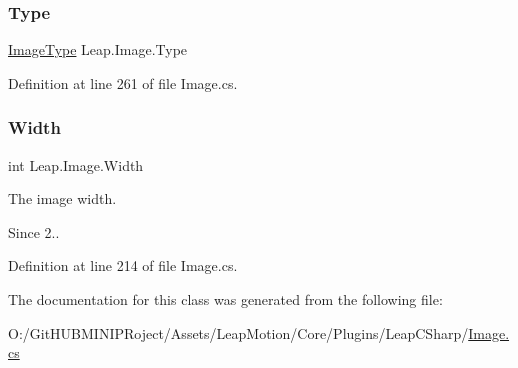 \mbox{\label{class_leap_1_1_image_abaa998d9eec529b2e69a0df4417502ee}} 
\subsubsection{\texorpdfstring{Type}{Type}}
{\footnotesize\ttfamily \mbox{\hyperlink{class_leap_1_1_image_a876a507d46b2dfce38d703a05cc4377f}{Image\+Type}} Leap.\+Image.\+Type\hspace{0.3cm}{\ttfamily [get]}}



Definition at line 261 of file Image.\+cs.

\mbox{\label{class_leap_1_1_image_a66b413ab158bf69102be0a58056a34b6}} 
\subsubsection{\texorpdfstring{Width}{Width}}
{\footnotesize\ttfamily int Leap.\+Image.\+Width\hspace{0.3cm}{\ttfamily [get]}}



The image width. 

\begin{DoxySince}{Since}
2.. 
\end{DoxySince}


Definition at line 214 of file Image.\+cs.



The documentation for this class was generated from the following file\+:\begin{DoxyCompactItemize}
\item 
O\+:/\+Git\+H\+U\+B\+M\+I\+N\+I\+P\+Roject/\+Assets/\+Leap\+Motion/\+Core/\+Plugins/\+Leap\+C\+Sharp/\mbox{\hyperlink{_image_8cs}{Image.\+cs}}\end{DoxyCompactItemize}
